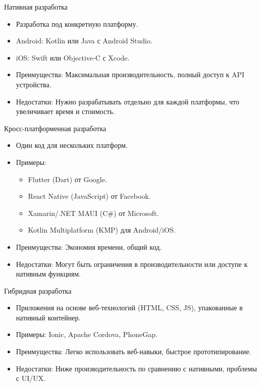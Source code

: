 \documentclass{beamer}
\begin{document}
\begin{frame}{Нативная разработка}
  \begin{itemize}
    \item Разработка под конкретную платформу.
    \item Android: Kotlin или Java с Android Studio.
    \item iOS: Swift или Objective-C с Xcode.
    \item Преимущества: Максимальная производительность, полный доступ к API устройства.
    \item Недостатки: Нужно разрабатывать отдельно для каждой платформы, что увеличивает время и стоимость.
  \end{itemize}
\end{frame}

\begin{frame}{Кросс-платформенная разработка}
  \begin{itemize}
    \item Один код для нескольких платформ.
    \item Примеры:
      \begin{itemize}
        \item Flutter (Dart) от Google.
        \item React Native (JavaScript) от Facebook.
        \item Xamarin/.NET MAUI (C\#) от Microsoft.
        \item Kotlin Multiplatform (KMP) для Android/iOS.
      \end{itemize}
    \item Преимущества: Экономия времени, общий код.
    \item Недостатки: Могут быть ограничения в производительности или доступе к нативным функциям.
  \end{itemize}
\end{frame}

\begin{frame}{Гибридная разработка}
  \begin{itemize}
    \item Приложения на основе веб-технологий (HTML, CSS, JS), упакованные в нативный контейнер.
    \item Примеры: Ionic, Apache Cordova, PhoneGap.
    \item Преимущества: Легко использовать веб-навыки, быстрое прототипирование.
    \item Недостатки: Ниже производительность по сравнению с нативными, проблемы с UI/UX.
  \end{itemize}
\end{frame}
\end{document}
